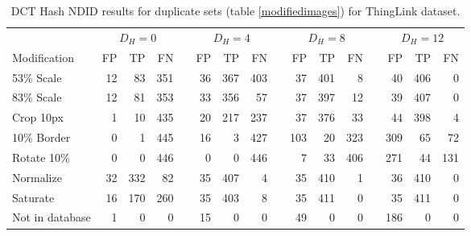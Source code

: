 \documentclass[english,12pt,a4paper,pdftex,elec,utf8, table]{aaltothesis}
\begin{document}
\begin{table}[htb]\footnotesize
\caption{ DCT Hash NDID results for duplicate sets (table \ref{modifiedimages}) for ThingLink dataset. }
\label{thinglinkdctresults}
\begin{center}
  \setlength\tabcolsep{3pt} %
  \begin{tabular}{@{}lrrrrrrrrrrrrrrr@{}}
    \toprule
    & \multicolumn{3}{c}{$D_H = 0$} &\phantom{abc} &\multicolumn{3}{c}{$D_H = 4$} &\phantom{abc} & \multicolumn{3}{c}{$D_H=8$} &\phantom{abc} & \multicolumn{3}{c}{$D_H=12$}\\
\cmidrule{2-4} \cmidrule{6-8} \cmidrule{10-12} \cmidrule{14-16}
    Modification & FP & TP & FN &\phantom{abc} & FP & TP & FN &\phantom{abc} & FP & TP & FN &\phantom{abc} & FP & TP & FN\\ \midrule
    53\% Scale   & 12 & 83 & 351 &\phantom{abc} & 36 & 367 & 403 &\phantom{abc} & 37 & 401 & 8 &\phantom{abc} & 40 & 406 & 0\\
    83\% Scale   & 12 & 81 & 353 &\phantom{abc} & 33 & 356 & 57 &\phantom{abc} & 37 & 397 & 12 &\phantom{abc} & 39 & 407 & 0\\
    Crop 10px    & 1 & 10 & 435 &\phantom{abc} & 20 & 217 & 237 &\phantom{abc} & 37 & 376 & 33 &\phantom{abc} & 44 & 398 & 4\\
    10\% Border  & 0 & 1 & 445 & \phantom{abc} & 16 & 3 & 427 &\phantom{abc} & 103 & 20 & 323&\phantom{abc} & 309 & 65 & 72\\
    Rotate 10\%  & 0 & 0 & 446 &\phantom{abc} & 0 & 0 & 446 &\phantom{abc} & 7 & 33 & 406 &\phantom{abc} & 271 & 44 & 131\\
    Normalize    & 32 & 332 & 82 &\phantom{abc} & 35 & 407 & 4 &\phantom{abc} & 35 & 410 & 1 &\phantom{abc} & 36 & 410 & 0\\
    Saturate     & 16 & 170 & 260 &\phantom{abc} & 35  & 403 & 8 &\phantom{abc} & 35 & 411 & 0 &\phantom{abc} & 35 & 411 & 0\\
   Not in database & 1 & 0 & 0 &\phantom{abc} & 15  & 0 & 0 &\phantom{abc} & 49 & 0 & 0 &\phantom{abc} & 186 & 0 & 0\\
    \bottomrule
\end{tabular}
\end{center}
\end{table}
\end{document}
